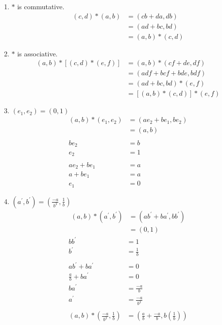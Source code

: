 \begin{enumerate}[label={\Alph*.},font={\bfseries}]
\begin{enumerate}[label={\arabic*},font={\bfseries}]
\begin{enumerate}[label={(\roman*)}]
    \item $*$ is commutative.
      \begin{align*}
        (c,d) * (a,b) &= (cb+da,db) \\
        &= (ad+bc,bd) \\
        &= (a,b) * (c,d)
      \end{align*}
    \item $*$ is associative.
      \begin{align*}
        (a,b) * \left[(c,d) * (e,f)\right] &= (a,b) * (cf+de,df) \\
        &= (adf+bcf+bde,bdf) \\
        &= (ad+bc, bd) * (e,f) \\
        &= \left[(a,b) * (c,d)\right] * (e,f)
      \end{align*}
    \item $(e_1,e_2) = (0,1)$
      \begin{align*}
        (a,b) * (e_1,e_2) &= (ae_2 + be_1, be_2) \\
        &= (a,b) \\
        \\
        be_2 &= b \\
        e_2 &= 1 \\
        \\
        ae_2 + be_1 &= a \\
        a + be_1 &= a \\
        e_1 &= 0
      \end{align*}
    \item $(a^\prime,b^\prime) = \left(\frac{-a}{b^2}, \frac{1}{b}\right)$
      \begin{align*}
        (a,b) * (a^\prime,b^\prime) &= (ab^\prime + ba^\prime, bb^\prime) \\
        &= (0,1)
      \end{align*}
      \begin{align*}
        bb^\prime &= 1 \\
        b^\prime &= \frac{1}{b} \\
        \\
        ab^\prime + ba^\prime &= 0 \\
        \frac{a}{b} + ba^\prime &= 0 \\
        ba^\prime &= \frac{-a}{b} \\
        a^\prime &= \frac{-a}{b^2} \\
        \\
        (a,b) * \left(\frac{-a}{b^2}, \frac{1}{b}\right) &= \left(\frac{a}{b} + \frac{-a}{b}, b\left(\frac{1}{b}\right)\right) \\

\end{align*}
\end{enumerate}
\end{enumerate}
\end{enumerate}
